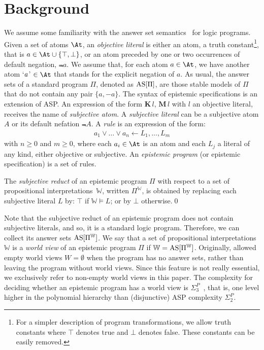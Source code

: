 \documentclass{new_tlp}
\def\K{\mathbf{K}\, }
\def\M{\mathbf{M}\, }
\let\sneg\relax
\newcommand{\sneg}{\ensuremath{\text{-}}}
\def\AS{\text{\rm AS}}
\newcommand\wv{\mathbb{W}}
\begin{document}
\section{Background}
\label{sec:background}
We assume some familiarity with the answer set semantics~\cite{GL91} for logic programs.
%
Given a set of atoms $\At$, an \emph{objective literal} is either an atom, a truth constant\footnote{For a simpler description of program transformations, we allow truth constants where $\top$ denotes true and $\bot$ denotes false. These constants can be easily removed.}, that is \mbox{$a \in \At \cup \{\top,\bot\}$}, or an atom preceded by one or two occurrences of default negation,
\mbox{$\Not a$}.
%
We assume that, for each atom $a \in \At$, we have another atom `$\sneg a$' $ \in \At$ that stands for the explicit negation of $a$.
%
As usual, the answer sets of a standard program $\Pi$, denoted as $\AS[\Pi]$, are those stable models of $\Pi$ that do not contain any pair $\{a, -a\}$.
%
The syntax of epistemic specifications is an extension of ASP.
%
An expression of the form $\K l$, $\M l$ with $l$ an objective literal, receives the name of \emph{subjective atom}.
%
A \emph{subjective literal} can be a subjective atom $A$ or its default nefation $\Not A$.
%
A \emph{rule} is an expression of the form:
\begin{gather}
a_1 \vee \dots \vee a_n \leftarrow L_1, \dots, L_m
	\label{eq:rule}
\end{gather}
with $n\geq 0$ and $m\geq 0$, where each $a_i \in \At$ is an atom and each $L_j$ a literal of any kind, either objective or subjective.
%
An \emph{epistemic program} (or epistemic specification) is a set of rules.

\begin{definition}
The \emph{subjective reduct} of an epistemic program $\Pi$ with respect to a set of propositional interpretations~$\wv$, written $\Pi^\wv$, is obtained by replacing each subjective literal $L$ by: $\top$ if $\wv \models L$; or by $\bot$ otherwise.\qed
\end{definition}

Note that the subjective reduct of an epistemic program does not contain subjective literals, and so, it is a standard logic program.
%
Therefore, we can collect its answer sets $\AS[\Pi^\wv]$.
%
We say that a set of propositional interpretations $\wv$ is a \emph{world view} of an epistemic program $\Pi$ if $\wv=\AS[\Pi^\wv]$.
%
Originally, \cite{gelfond91a} allowed empty world views $W=\emptyset$ when the program has no answer sets, rather than leaving the program without world views.
%
Since this feature is not really essential, we exclusively refer to non-empty world views in this paper.
%
The complexity for deciding whether an epistemic program has a world view is $\Sigma^{P}_{3}$~\cite{truszczynski11b}, that is, one level higher in the polynomial hierarchy than  (disjunctive) ASP complexity $\Sigma^{P}_{2}$.
\end{document}
